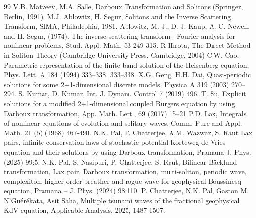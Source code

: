 \documentclass{article}%
\begin{document}
\begin{thebibliography}{99}
		  V.B. Matveev, M.A. Salle, Darboux Transformation and Solitons (Springer, Berlin, 1991).
		 M.J. Ablowitz, H. Segur, Solitons and the Inverse Scattering Transform, SIMA, Philadephia, 1981.
		 Ablowitz, M. J., D. J. Kaup, A. C. Newell, and H. Segur, (1974). The
		inverse scattering transform - Fourier analysis for nonlinear problems, Stud. Appl.
		Math. 53 249-315.
		 R Hirota, The Direct Method in Soliton Theory (Cambridge University Press, Cambridge, 2004)
		 C.W. Cao, Parametric representation of the finite-band solution of the Heisenberg equation, Phys. Lett. A 184 (1994)
		333–338.
		333–338.
		 X.G. Geng, H.H. Dai, Quasi-periodic solutions for some 2+1-dimensional discrete models, Physica A 319 (2003) 270–294.
		 S. Kumar, D. Kumar, Int. J. Dynam. Control 7 (2019) 496.
		T. Su, Explicit solutions for a modified 2+1-dimensional coupled Burgers
		equation by using Darboux transformation, App. Math. Lett., 69 (2017) 15–21
		 P.D. Lax, Integrals of nonlinear equations of evolution and solitary waves, Comm. Pure and Appl. Math. 21 (5) (1968) 467-490.
		 N.K. Pal, P. Chatterjee, A.M. Wazwaz, S. Raut Lax pairs, infinite conservation laws of stochastic potential Korteweg-de Vries equation and their solutions by using Darboux transformation, Pramana-J. Phys. (2025) 99:5.
		 N.K. Pal, S. Nasipuri, P. Chatterjee, S. Raut, Bilinear Bäcklund transformation, Lax pair, Darboux transformation, multi-soliton, periodic wave, complexiton, higher-order breather and rogue wave for geophysical
		Boussinesq equation, Pramana – J. Phys. (2024) 98:110.
		P. Chatterjee, N.K. Pal, Gaston M. N'Guérékata, Asit Saha, Multiple tsunami waves of the fractional geophysical KdV equation, Applicable Analysis, 2025, 1487-1507.
			
	\end{thebibliography}
	
\end{document}

